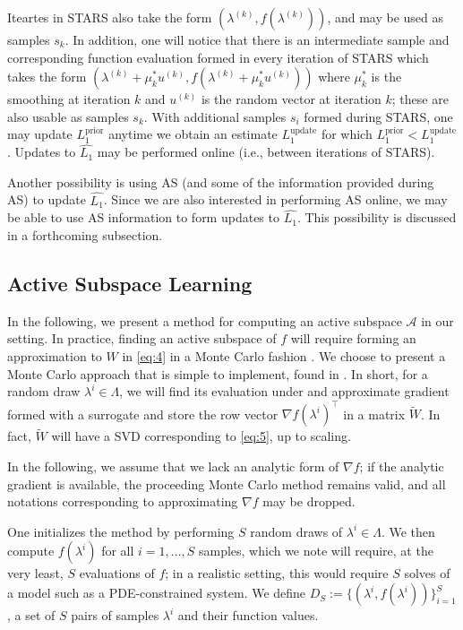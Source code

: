 \documentclass{amsart}
\newcommand{\A}{\mathcal{A}}
\begin{document}
Iteartes in STARS also take the form $(\lambda^{(k)}, f(\lambda^{(k)}))$, and may be used as samples $s_k$. In addition, one will notice that there is an intermediate sample and corresponding function evaluation formed in every iteration of STARS which takes the form $(\lambda^{(k)}+\mu^*_k u^{(k)}, f(\lambda^{(k)}+\mu^*_k u^{(k)}))$ where $\mu^*_k$ is the smoothing at iteration $k$ and $u^{(k)}$ is the random vector at iteration $k$; these are also usable as samples $s_k$. With additional samples $s_i$ formed during STARS, one may update $L_1^\text{prior}$ anytime we obtain an estimate $L_1^\text{update}$ for which $L_1^\text{prior}<L_1^\text{update}$. Updates to $\hat{L_1}$ may be performed online (i.e., between iterations of STARS).

Another possibility is using AS (and some of the information provided during AS) to update $\hat{L_1}$. Since we are also interested in performing AS online, we may be able to use AS information to form updates to $\hat{L_1}$. This possibility is discussed in a forthcoming subsection.


\subsection{Active Subspace Learning}

In the following, we present a method for computing an active subspace $\A$ in our setting. In practice, finding an active subspace of $f$ will require forming an approximation to $W$ in \eqref{eq:4} in a Monte Carlo fashion \cite{ConstantineMC}. We choose to present a Monte Carlo approach that is simple to implement, found in \cite{Russi}. In short, for a random draw $\lambda^i \in \Lambda$, we will find its evaluation under and approximate gradient formed with a surrogate and store the row vector $\nabla f(\lambda^i)^\top$ in a matrix $\tilde{W}$. In fact, $\tilde{W}$ will have a SVD corresponding to \eqref{eq:5}, up to scaling.

In the following, we assume that we lack an analytic form of $\nabla f$; if the analytic gradient is available, the proceeding Monte Carlo method remains valid, and all notations corresponding to approximating $\nabla f$ may be dropped.


One initializes the method by performing $S$ random draws of $\lambda^i \in \Lambda$. We then compute $f(\lambda^i)$ for all $i=1,\ldots,S$ samples, which we note will require, at the very least, $S$ evaluations of $f$; in a realistic setting, this would require $S$ solves of a model such as a PDE-constrained system. We define $D_S:=\{(\lambda^i,f(\lambda^i))\}_{i=1}^S$, a set of $S$ pairs of samples $\lambda^i$ and their function values. 
\end{document}
